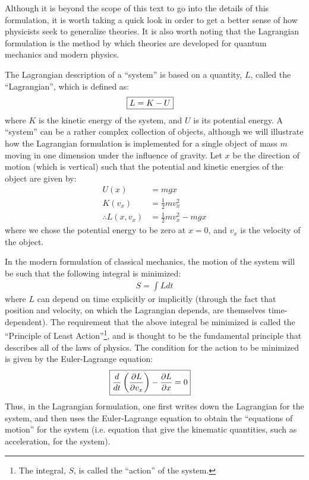 Although it is beyond the scope of this text to go into the details of this formulation, it is worth taking a quick look in order to get a better sense of how physicists seek to generalize theories. It is also worth noting that the Lagrangian formulation is the method by which theories are developed for quantum mechanics and modern physics. 

The Lagrangian description of a ``system'' is based on a quantity, $L$, called the ``Lagrangian'', which is defined as:
\begin{align}
\Aboxed{L = K - U}
\end{align}
where $K$ is the kinetic energy of the system, and $U$ is its potential energy. A ``system'' can be a rather complex collection of objects, although we will illustrate how the Lagrangian formulation is implemented for a single object of mass $m$ moving in one dimension under the influence of gravity. Let $x$ be the direction of motion (which is vertical) such that the potential and kinetic energies of the object are given by:
\begin{align*}
U(x) &= mgx\\
K(v_x) &= \frac{1}{2}mv_x^2\\
\therefore L(x,v_x) &= \frac{1}{2}mv_x^2 - mgx
\end{align*}
where we chose the potential energy to be zero at $x=0$, and $v_x$ is the velocity of the object.

In the modern formulation of classical mechanics, the motion of the system will be such that the following integral is minimized:
\begin{align*}
S = \int Ldt
\end{align*}
where $L$ can depend on time explicitly or implicitly (through the fact that position and velocity, on which the Lagrangian depends, are themselves time-dependent). The requirement that the above integral be minimized is called the ``Principle of Least Action''\footnote{The integral, $S$, is called the ``action'' of the system.}, and is thought to be the fundamental principle that describes all of the laws of physics. The condition for the action to be minimized is given by the Euler-Lagrange equation:
\begin{align}
\Aboxed{\frac{d}{dt}\left(\die{L}{v_x}\right)-\die{L}{x} = 0}
\end{align}
Thus, in the Lagrangian formulation, one first writes down the Lagrangian for the system, and then uses the Euler-Lagrange equation to obtain the ``equations of motion'' for the system (i.e. equation that give the kinematic quantities, such as acceleration, for the system). 

